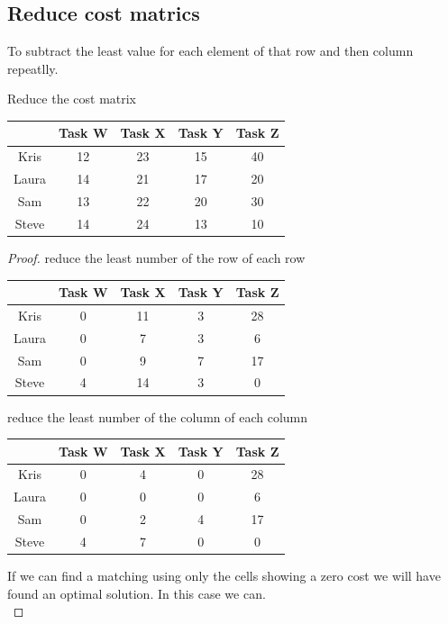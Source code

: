 \documentclass[a4paper]{article}
\begin{document}
\subsection{Reduce cost matrics}
To subtract the least value for each element of that row and then column repeatlly.
\begin{eg}
  Reduce the cost matrix
	\begin{center}
		\begin{tabular}{|c|c|c|c|c|}
			\hline
			      & Task W & Task X & Task Y & Task Z \\
			\hline
			Kris  & 12     & 23     & 15     & 40     \\
			\hline
			Laura & 14     & 21     & 17     & 20     \\
			\hline
			Sam   & 13     & 22     & 20     & 30     \\
			\hline
			Steve & 14     & 24     & 13     & 10     \\
			\hline
		\end{tabular}
  \end{center}
  \begin{proof}
   reduce the least number of the row of each row
    \begin{center}
      \begin{tabular}{|c|c|c|c|c|}
        \hline
              & Task W & Task X & Task Y & Task Z \\
        \hline
        Kris  & 0     & 11     & 3     & 28     \\
        \hline
        Laura & 0     & 7     & 3     & 6     \\
        \hline
        Sam   & 0     & 9     & 7     & 17     \\
        \hline
        Steve & 4     & 14     & 3     & 0     \\
        \hline
      \end{tabular}
    \end{center}
    reduce the least number of the column of each column
    \begin{center}
      \begin{tabular}{|c|c|c|c|c|}
        \hline
              & Task W & Task X & Task Y & Task Z \\
        \hline
        Kris  & 0     & 4     & 0     & 28     \\
        \hline
        Laura & 0     & 0     & 0     & 6     \\
        \hline
        Sam   & 0     & 2     & 4     & 17     \\
        \hline
        Steve & 4     & 7     & 0     & 0     \\
        \hline
      \end{tabular}
    \end{center}
    If we can find a matching using only the cells showing a zero cost we will have found an optimal solution. In this case we can.\\
    

\end{proof}
\end{eg}
\end{document}
